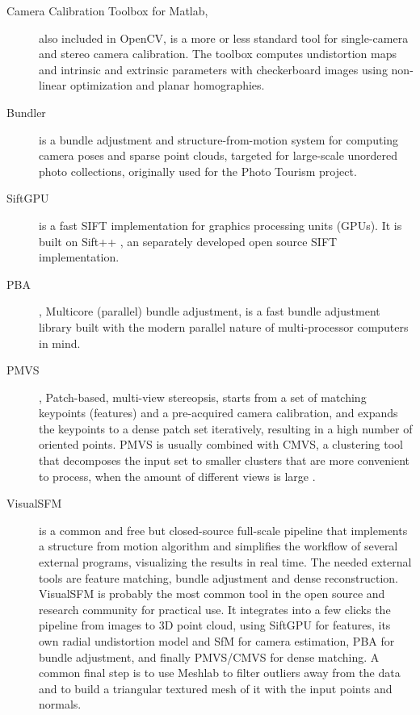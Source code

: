 \begin{description}
	\item[Camera Calibration Toolbox for Matlab,] \cite{camcalmatlab} also included in OpenCV, is a more or less standard tool for single-camera and stereo camera calibration.
		The toolbox computes undistortion maps and intrinsic and extrinsic parameters with checkerboard images using non-linear optimization and planar homographies.

	\item[Bundler] \cite{snavely2006photo} is a bundle adjustment and structure-from-motion system for computing camera poses and sparse point clouds, targeted for large-scale unordered photo collections, originally used for the Photo Tourism project.

	\item[SiftGPU] \cite{changchang2007siftgpu} is a fast SIFT implementation for graphics processing units (GPUs).
		It is built on Sift++ \cite{vedaldi2011sift++}, an separately developed open source SIFT implementation.

	\item[PBA], \cite{wu2011multicore} Multicore (parallel) bundle adjustment, is a fast bundle adjustment library built with the modern parallel nature of multi-processor computers in mind.

	\item[PMVS], Patch-based, multi-view stereopsis, starts from a set of matching keypoints (features) and a pre-acquired camera calibration, and expands the keypoints to a dense patch set iteratively, resulting in a high number of oriented points.
		PMVS is usually combined with CMVS, a clustering tool that decomposes the input set to smaller clusters that are more convenient to process, when the amount of different views is large \cite{furukawa2010accurate,furukawa2012patch}.

	\item[VisualSFM] \cite{wu2013towards} is a common and free but closed-source full-scale pipeline that implements a structure from motion algorithm and simplifies the workflow of several external programs, visualizing the results in real time.
		The needed external tools are feature matching, bundle adjustment and dense reconstruction.
		VisualSFM is probably the most common tool in the open source and research community for practical use.
		It integrates into a few clicks the pipeline from images to 3D point cloud, using SiftGPU for features, its own radial undistortion model and SfM for camera estimation, PBA for bundle adjustment, and finally PMVS/CMVS for dense matching.
		A common final step is to use Meshlab to filter outliers away from the data and to build a triangular textured mesh of it with the input points and normals.


\end{description}
